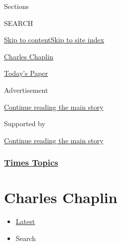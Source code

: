 Sections

SEARCH

\protect\hyperlink{site-content}{Skip to
content}\protect\hyperlink{site-index}{Skip to site index}

\href{https://www.nytimes.com/topic/person/charles-chaplin}{Charles
Chaplin}

\href{https://myaccount.nytimes.com/auth/login?response_type=cookie\&client_id=vi}{}

\href{https://www.nytimes.com/section/todayspaper}{Today's Paper}

Advertisement

\protect\hyperlink{after-top}{Continue reading the main story}

Supported by

\protect\hyperlink{after-sponsor}{Continue reading the main story}

\hypertarget{times-topics}{%
\subsubsection{\texorpdfstring{\href{/index.html}{Times
Topics}}{Times Topics}}\label{times-topics}}

\hypertarget{charles-chaplin}{%
\section{Charles Chaplin}\label{charles-chaplin}}

\begin{itemize}
\tightlist
\item
  \protect\hyperlink{stream-panel}{Latest}
\item
  Search
\end{itemize}

